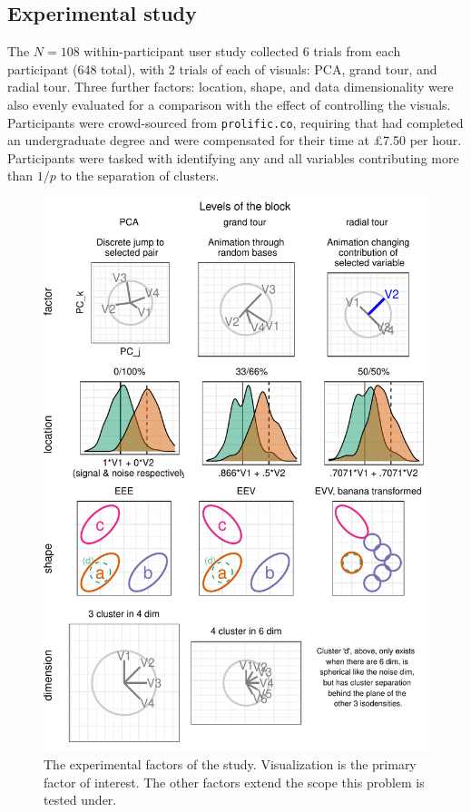 \documentclass[
  11,
]{article}
\begin{document}
\hypertarget{sec:expStudy}{%
\subsection{Experimental study}\label{sec:expStudy}}

The \(N=108\) within-participant user study collected 6 trials from each participant (648 total), with 2 trials of each of visuals: PCA, grand tour, and radial tour. Three further factors: location, shape, and data dimensionality were also evenly evaluated for a comparison with the effect of controlling the visuals. Participants were crowd-sourced from \texttt{prolific.co}, requiring that had completed an undergraduate degree and were compensated for their time at \pounds 7.50 per hour. Participants were tasked with identifying any and all variables contributing more than \(1/p\) to the separation of clusters.

\begin{figure}

{\centering \includegraphics[width=0.9\linewidth,]{figures/study_exp_factors} 

}

\caption{The experimental factors of the study. Visualization is the primary factor of interest. The other factors extend the scope this problem is tested under.}\label{fig:studyExpFactors}
\end{figure}
\end{document}
